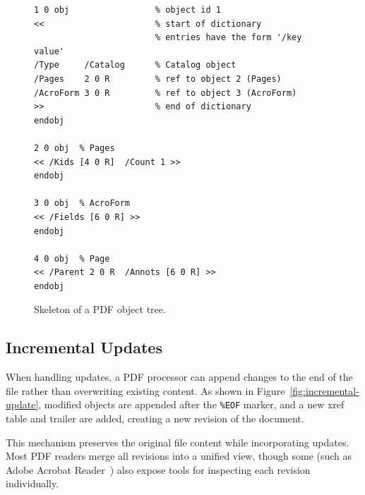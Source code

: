 \documentclass[12pt]{article}
\begin{document}
\begin{figure}[H]
	\centering
	\begin{Verbatim}[frame=single,fontsize=\footnotesize,xleftmargin=0.05\linewidth,xrightmargin=0.00\linewidth]
1 0 obj                 % object id 1
<<                      % start of dictionary
                        % entries have the form '/key value'
/Type     /Catalog      % Catalog object
/Pages    2 0 R         % ref to object 2 (Pages)
/AcroForm 3 0 R         % ref to object 3 (AcroForm)
>>                      % end of dictionary
endobj

2 0 obj  % Pages
<< /Kids [4 0 R]  /Count 1 >>
endobj

3 0 obj  % AcroForm
<< /Fields [6 0 R] >>
endobj

4 0 obj  % Page
<< /Parent 2 0 R  /Annots [6 0 R] >>
endobj
	\end{Verbatim}
	\caption{Skeleton of a PDF object tree.\label{fig:pdf-object-tree}}
\end{figure}


\subsection{Incremental Updates}

When handling updates, a PDF processor can append changes to the end of the file rather than
overwriting existing content. As shown in Figure~\ref{fig:incremental-update}, modified objects are appended after the \texttt{\%EOF} marker, and a new xref table and trailer are added, creating a new revision of the document.

This mechanism preserves the original file content while incorporating updates. Most PDF readers merge all revisions into a unified view, though some (such as Adobe Acrobat
Reader~\cite{adobereader}) also expose tools for inspecting each revision individually.
\end{document}
